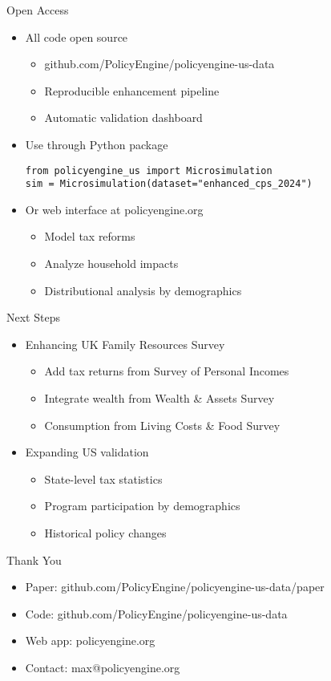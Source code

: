 \documentclass{beamer}
\begin{document}
\begin{frame}[fragile]{Open Access}
    \begin{itemize}
        \item All code open source
        \begin{itemize}
            \item github.com/PolicyEngine/policyengine-us-data
            \item Reproducible enhancement pipeline
            \item Automatic validation dashboard
        \end{itemize}
        \pause
        \item Use through Python package\\[0.5em]
\begin{verbatim}
from policyengine_us import Microsimulation
sim = Microsimulation(dataset="enhanced_cps_2024")
\end{verbatim}
        \pause
        \item Or web interface at policyengine.org
        \begin{itemize}
            \item Model tax reforms
            \item Analyze household impacts
            \item Distributional analysis by demographics
        \end{itemize}
    \end{itemize}
\end{frame}

\begin{frame}{Next Steps}
    \begin{itemize}
        \item Enhancing UK Family Resources Survey
        \begin{itemize}
            \item Add tax returns from Survey of Personal Incomes
            \item Integrate wealth from Wealth \& Assets Survey
            \item Consumption from Living Costs \& Food Survey
        \end{itemize}
        \pause
        \item Expanding US validation
        \begin{itemize}
            \item State-level tax statistics
            \item Program participation by demographics
            \item Historical policy changes
        \end{itemize}
    \end{itemize}
\end{frame}

\begin{frame}{Thank You}
    \begin{itemize}
        \item Paper: github.com/PolicyEngine/policyengine-us-data/paper
        \item Code: github.com/PolicyEngine/policyengine-us-data
        \item Web app: policyengine.org
        \item Contact: max@policyengine.org
    \end{itemize}
\end{frame}
\end{document}
